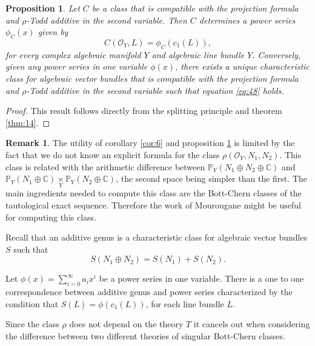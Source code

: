 \documentclass[10pt,twoside]{article}
\numberwithin{equation}{section}
\theoremstyle{plain}
\newtheorem{proposition}[equation]{Proposition}
\theoremstyle{definition}
\newtheorem{remark}[equation]{Remark}
\begin{document}
\begin{proposition} \label{prop:11}
  Let $C$ be a class that is compatible with the
  projection formula and
  $\rho $-Todd additive in the second variable. Then $C$
  determines a power series $\phi _{C}(x)$ given by
  \begin{equation}\label{eq:48}
    C(\mathcal{O}_{Y},L)=\phi_{C} (c_{1}(L)),
  \end{equation}
  for every complex algebraic manifold $Y$ and algebraic line bundle
  $Y$. 
  Conversely, given any power series in one variable $\phi (x)$, there
  exists a unique characteristic class for algebraic vector bundles
  that is compatible with the 
  projection formula and $\rho
  $-Todd additive in the second variable such that equation
  \eqref{eq:48} holds.
\end{proposition}
\begin{proof}
  This result follows directly from the splitting principle and
  theorem \ref{thm:14}.
\end{proof}

\begin{remark} \label{rem:2}
The utility of corollary \ref{cor:6} and proposition \ref{prop:11} is
limited by the fact that 
we do not know an explicit formula for the class $\rho
(\mathcal{O}_{Y},N_{1},N_{2})$. This class is related with the
arithmetic difference between $\mathbb{P}_{Y}(N_{1}\oplus N_{2}\oplus
\mathbb{C})$ and $\mathbb{P}_{Y}(N_{1}\oplus
\mathbb{C})\underset{Y}{\times }\mathbb{P}_{Y}(N_{2}\oplus
\mathbb{C})$, the second space being simpler than the first. The main
ingredients needed to compute this class are the Bott-Chern classes of
the tautological exact sequence. Therefore the work of Mourougane
\cite{Mourougane04:cbcc} might be useful for computing this class.  
\end{remark}


Recall that an additive genus is a characteristic class for algebraic
vector bundles $S$ such that
\begin{displaymath}
  S(N_{1}\oplus N_{2})=S(N_{1})+S( N_{2}).
\end{displaymath}

Let $\phi (x)=\sum_{i=0}^{\infty}a_{i}x^{i}$ be a power series in one
variable. There is a one to one correspondence between additive genus
and power series characterized by the condition that
$S(L)=\phi (c_{1}(L))$, for each line bundle $L$. 


Since the class $\rho $ does not depend on the theory $T$ it
cancels out when considering the difference between two different
theories of singular Bott-Chern classes.
\end{document}

